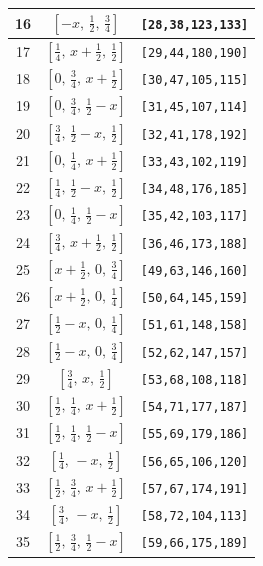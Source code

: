 \documentclass[fleqn,8pt]{jsarticle}
\begin{document}
\begin{longtable}{ccc}
16 & $\left[ - x,\, \frac{1}{2},\, \frac{3}{4} \right]$ & {\tt [28,38,123,133]} \\ \hline
17 & $\left[ \frac{1}{4},\, x + \frac{1}{2},\, \frac{1}{2} \right]$ & {\tt [29,44,180,190]} \\ \hline
18 & $\left[ 0,\, \frac{3}{4},\, x + \frac{1}{2} \right]$ & {\tt [30,47,105,115]} \\ \hline
19 & $\left[ 0,\, \frac{3}{4},\, \frac{1}{2} - x \right]$ & {\tt [31,45,107,114]} \\ \hline
20 & $\left[ \frac{3}{4},\, \frac{1}{2} - x,\, \frac{1}{2} \right]$ & {\tt [32,41,178,192]} \\ \hline
21 & $\left[ 0,\, \frac{1}{4},\, x + \frac{1}{2} \right]$ & {\tt [33,43,102,119]} \\ \hline
22 & $\left[ \frac{1}{4},\, \frac{1}{2} - x,\, \frac{1}{2} \right]$ & {\tt [34,48,176,185]} \\ \hline
23 & $\left[ 0,\, \frac{1}{4},\, \frac{1}{2} - x \right]$ & {\tt [35,42,103,117]} \\ \hline
24 & $\left[ \frac{3}{4},\, x + \frac{1}{2},\, \frac{1}{2} \right]$ & {\tt [36,46,173,188]} \\ \hline
25 & $\left[ x + \frac{1}{2},\, 0,\, \frac{3}{4} \right]$ & {\tt [49,63,146,160]} \\ \hline
26 & $\left[ x + \frac{1}{2},\, 0,\, \frac{1}{4} \right]$ & {\tt [50,64,145,159]} \\ \hline
27 & $\left[ \frac{1}{2} - x,\, 0,\, \frac{1}{4} \right]$ & {\tt [51,61,148,158]} \\ \hline
28 & $\left[ \frac{1}{2} - x,\, 0,\, \frac{3}{4} \right]$ & {\tt [52,62,147,157]} \\ \hline
29 & $\left[ \frac{3}{4},\, x,\, \frac{1}{2} \right]$ & {\tt [53,68,108,118]} \\ \hline
30 & $\left[ \frac{1}{2},\, \frac{1}{4},\, x + \frac{1}{2} \right]$ & {\tt [54,71,177,187]} \\ \hline
31 & $\left[ \frac{1}{2},\, \frac{1}{4},\, \frac{1}{2} - x \right]$ & {\tt [55,69,179,186]} \\ \hline
32 & $\left[ \frac{1}{4},\, - x,\, \frac{1}{2} \right]$ & {\tt [56,65,106,120]} \\ \hline
33 & $\left[ \frac{1}{2},\, \frac{3}{4},\, x + \frac{1}{2} \right]$ & {\tt [57,67,174,191]} \\ \hline
34 & $\left[ \frac{3}{4},\, - x,\, \frac{1}{2} \right]$ & {\tt [58,72,104,113]} \\ \hline
35 & $\left[ \frac{1}{2},\, \frac{3}{4},\, \frac{1}{2} - x \right]$ & {\tt [59,66,175,189]} \\ \hline

\end{longtable}
\end{document}
